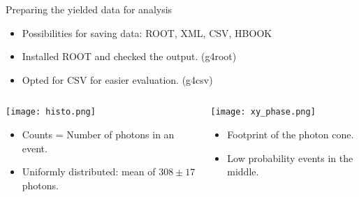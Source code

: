 \documentclass[11pt]{beamer}
\begin{document}
\begin{frame}{Preparing the yielded data for analysis}
    \begin{itemize}
        \item<tri@1-> Possibilities for saving data: ROOT, XML, CSV, HBOOK
        \item<tri@1-> Installed ROOT and checked the output. (g4root)
        \item<tri@1-> Opted for CSV for easier evaluation. (g4csv)
    \end{itemize}
\begin{columns}
\begin{column}{0.5\textwidth}
\texttt{[image: histo.png]}
\begin{itemize}
    \item<tri@1-> Counts = Number of photons in an event.
    \item<tri@1-> Uniformly distributed: mean of $308\pm17$ photons.
\end{itemize}
\end{column}
\begin{column}{0.5\textwidth}
\texttt{[image: xy\_phase.png]}
\begin{itemize}
    \item<tri@1-> Footprint of the photon cone.
    \item<tri@1-> Low probability events in the middle.
    \end{itemize}
\end{column}
\end{columns}
\end{frame}
\end{document}
